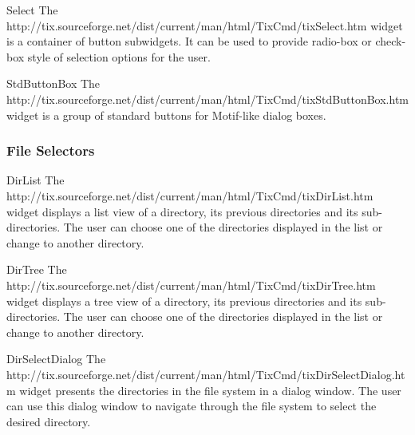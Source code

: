 
\begin{classdesc}{Select}{}
The 
{http://tix.sourceforge.net/dist/current/man/html/TixCmd/tixSelect.htm}
widget is a container of button subwidgets. It can be used to provide
radio-box or check-box style of selection options for the user.
\end{classdesc}


\begin{classdesc}{StdButtonBox}{}
The 
{http://tix.sourceforge.net/dist/current/man/html/TixCmd/tixStdButtonBox.htm}
widget is a group of standard buttons for Motif-like dialog boxes.
\end{classdesc}



\subsubsection{File Selectors}

\begin{classdesc}{DirList}{}
The 
{http://tix.sourceforge.net/dist/current/man/html/TixCmd/tixDirList.htm} widget
displays a list view of a directory, its previous directories and its
sub-directories. The user can choose one of the directories displayed
in the list or change to another directory.
\end{classdesc}


\begin{classdesc}{DirTree}{}
The 
{http://tix.sourceforge.net/dist/current/man/html/TixCmd/tixDirTree.htm}
widget displays a tree view of a directory, its previous directories
and its sub-directories. The user can choose one of the directories
displayed in the list or change to another directory.
\end{classdesc}


\begin{classdesc}{DirSelectDialog}{}
The 
{http://tix.sourceforge.net/dist/current/man/html/TixCmd/tixDirSelectDialog.htm}
widget presents the directories in the file system in a dialog
window.  The user can use this dialog window to navigate through the
file system to select the desired directory.
\end{classdesc}

